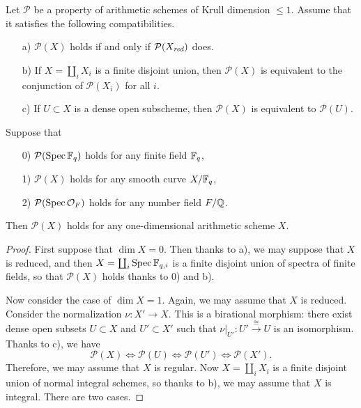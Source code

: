 \documentclass{article}
\numberwithin{equation}{section}
\begin{document}
\begin{lemma}
  \label{lemma:devissage}
  Let $\mathcal{P}$ be a property of arithmetic schemes of Krull dimension
  $\le 1$. Assume that it satisfies the following compatibilities.
  \begin{enumerate}
  \item[a)] $\mathcal{P} (X)$ holds if and only if $\mathcal{P} (X_{\text{\it red}})$ does.

  \item[b)] If $X = \coprod_i X_i$ is a finite disjoint union, then
    $\mathcal{P} (X)$ is equivalent to the conjunction of $\mathcal{P} (X_i)$ for
    all $i$.

  \item[c)] If $U \subset X$ is a dense open subscheme, then $\mathcal{P} (X)$
    is equivalent to $\mathcal{P} (U)$.
  \end{enumerate}
  Suppose that
  \begin{enumerate}
  \item[0)] $\mathcal{P} (\operatorname{Spec} \mathbb{F}_q)$ holds for any finite field $\mathbb{F}_q$,

  \item[1)] $\mathcal{P} (X)$ holds for any smooth curve $X/\mathbb{F}_q$,

  \item[2)] $\mathcal{P} (\operatorname{Spec} \mathcal{O}_F)$ holds for any number field
    $F/\mathbb{Q}$.
  \end{enumerate}
  Then $\mathcal{P} (X)$ holds for any one-dimensional arithmetic scheme $X$.

  \begin{proof}
    First suppose that $\dim X = 0$. Then thanks to a), we may suppose that $X$
    is reduced, and then $X = \coprod_i \operatorname{Spec} \mathbb{F}_{q,i}$ is a finite disjoint
    union of spectra of finite fields, so that $\mathcal{P} (X)$ holds thanks to
    0) and b).

    Now consider the case of $\dim X = 1$. Again, we may assume that $X$ is
    reduced. Consider the normalization $\nu\colon X' \to X$. This is a
    birational morphism: there exist dense open subsets $U \subset X$ and
    $U' \subset X'$ such that
    $\left.\nu\right|_{U'}\colon U' \xrightarrow{\cong} U$ is an
    isomorphism. Thanks to c), we have
    \[ \mathcal{P} (X) \iff
      \mathcal{P} (U) \iff
      \mathcal{P} (U') \iff
      \mathcal{P} (X'). \]
    Therefore, we may assume that $X$ is regular. Now $X = \coprod_i X_i$ is a
    finite disjoint union of normal integral schemes, so thanks to b), we may
    assume that $X$ is integral. There are two cases.


\end{proof}
\end{lemma}
\end{document}
